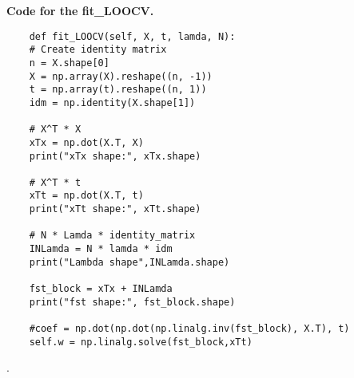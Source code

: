 \textbf{Code for the fit\_LOOCV.}

\begin{lstlisting}
    def fit_LOOCV(self, X, t, lamda, N):
    # Create identity matrix
    n = X.shape[0]
    X = np.array(X).reshape((n, -1))
    t = np.array(t).reshape((n, 1))
    idm = np.identity(X.shape[1])
    
    # X^T * X 
    xTx = np.dot(X.T, X)
    print("xTx shape:", xTx.shape)

    # X^T * t
    xTt = np.dot(X.T, t)
    print("xTt shape:", xTt.shape)

    # N * Lamda * identity_matrix
    INLamda = N * lamda * idm
    print("Lambda shape",INLamda.shape)

    fst_block = xTx + INLamda
    print("fst shape:", fst_block.shape) 

    #coef = np.dot(np.dot(np.linalg.inv(fst_block), X.T), t)
    self.w = np.linalg.solve(fst_block,xTt)
\end{lstlisting}
.